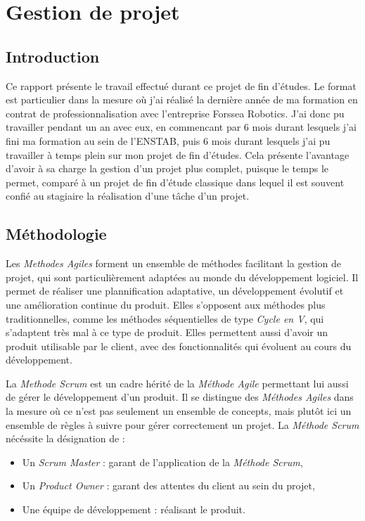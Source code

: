 \chapter{Gestion de projet}
	
	\section{Introduction}
		Ce rapport présente le travail effectué durant ce projet de fin d'études. Le format est particulier dans la mesure où j'ai réalisé la dernière année de ma formation en contrat de professionnalisation avec l'entreprise Forssea Robotics. J'ai donc pu travailler pendant un an avec eux, en commencant par 6 mois durant lesquels j'ai fini ma formation au sein de l'\gls{ENSTAB}, puis 6 mois durant lesquels j'ai pu travailler à temps plein sur mon projet de fin d'études. Cela présente l'avantage d'avoir à sa charge la gestion d'un projet plus complet, puisque le temps le permet, comparé à un projet de fin d'étude classique dans lequel il est souvent confié au stagiaire la réalisation d'une tâche d'un projet.

	\section{Méthodologie}
		Les \textit{Methodes Agiles} forment un ensemble de méthodes facilitant la gestion de projet, qui sont particulièrement adaptées au monde du développement logiciel. Il permet de réaliser une plannification adaptative, un développement évolutif et une amélioration continue du produit. Elles s'opposent aux méthodes plus traditionnelles, comme les méthodes séquentielles de type \textit{Cycle en V}, qui s'adaptent très mal à ce type de produit. Elles permettent aussi d'avoir un produit utilisable par le client, avec des fonctionnalités qui évoluent au cours du développement.

		La \textit{Methode Scrum} est un cadre hérité de la \textit{Méthode Agile} permettant lui aussi de gérer le développement d'un produit. Il se distingue des \textit{Méthodes Agiles} dans la mesure où ce n'est pas seulement un ensemble de concepts, mais plutôt ici un ensemble de règles à suivre pour gérer correctement un projet. La \textit{Méthode Scrum} nécéssite la désignation de :

		\begin{itemize}
			\item Un \textit{Scrum Master} : garant de l'application de la \textit{Méthode Scrum},
			\item Un \textit{Product Owner} : garant des attentes du client au sein du projet,
			\item Une équipe de développement : réalisant le produit.
		\end{itemize}

